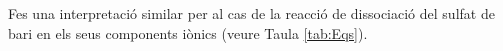 \begin{exr}{}
    Fes una interpretació similar per al cas de la reacció de dissociació del sulfat de bari en els seus components iònics (veure Taula \ref{tab:Eqs}).
    \end{exr}
